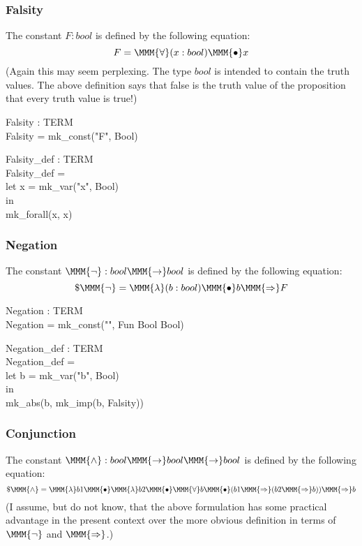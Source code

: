 \documentclass[a4paper,11pt,titlepage]{article}
\begin{document}
\begin{titlepage}
\subsubsection{Falsity}
The constant $F:bool$ is defined by the following equation:
$$F = \MMM{\forall}(x:bool) \MMM{\bullet} x$$
(Again this may seem perplexing. The type $bool$
is intended to contain the truth values. The above definition
says that false is the truth value of the proposition that
every truth value is true!)
\begin{HOLConst}
\+	\PrNL{}Falsity\PrNN{} : TERM\\
\PrPH{}
\+	Falsity = mk\_const("F", Bool)\\
\end{HOLConst}
\begin{HOLConst}
\+	\PrNL{}Falsity\_def\PrNN{} : TERM\\
\PrPH{}
\+	Falsity\_def =\\
\+	let x = mk\_var("x", Bool)\\
\+	in\\
\+	mk\_forall(x, x)\\
\end{HOLConst}
\subsubsection{Negation}
The constant $\MMM{\lnot}:bool \MMM{\rightarrow} bool$ is defined by the following
equation:
$$\$\MMM{\lnot} = \MMM{\lambda}(b:bool)\MMM{\bullet}b \MMM{\Rightarrow} F$$
\begin{HOLConst}
\+	\PrNL{}Negation\PrNN{} : TERM\\
\PrPH{}
\+	Negation = mk\_const("\MMM{\lnot}", Fun Bool Bool)\\
\end{HOLConst}
\begin{HOLConst}
\+	\PrNL{}Negation\_def\PrNN{} : TERM\\
\PrPH{}
\+	Negation\_def =\\
\+	let b = mk\_var("b", Bool)\\
\+	in\\
\+	mk\_abs(b, mk\_imp(b, Falsity))\\
\end{HOLConst}
\subsubsection{Conjunction}
The constant $\MMM{\land}: bool \MMM{\rightarrow} bool \MMM{\rightarrow} bool$
is defined by the following equation:
$$\$\MMM{\land} = \MMM{\lambda}b1\MMM{\bullet}\MMM{\lambda}b2\MMM{\bullet}\MMM{\forall}b\MMM{\bullet}(b1 \MMM{\Rightarrow} (b2 \MMM{\Rightarrow} b)) \MMM{\Rightarrow} b$$
(I assume, but do not know, that the above formulation
has some practical advantage in the present
context over the more obvious definition
in terms of $\MMM{\lnot}$ and $\MMM{\Rightarrow}$.)


\end{titlepage}
\end{document}
